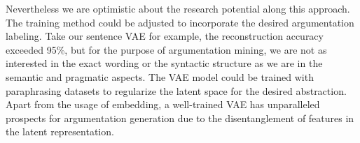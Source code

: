 \documentclass[11pt]{article}
\begin{document}
Nevertheless we are optimistic about the research potential along this approach.
The training method could be adjusted to incorporate the desired argumentation labeling.
Take our sentence VAE for example,
the reconstruction accuracy exceeded 95\%,
but for the purpose of argumentation mining,
we are not as interested in the exact wording or the syntactic structure
as we are in the semantic and pragmatic aspects.
The VAE model could be trained with paraphrasing datasets
to regularize the latent space for the desired abstraction.
Apart from the usage of embedding,
a well-trained VAE has unparalleled prospects for argumentation generation
due to the disentanglement of features in the latent representation.

\printbibliography[]
\end{document}
